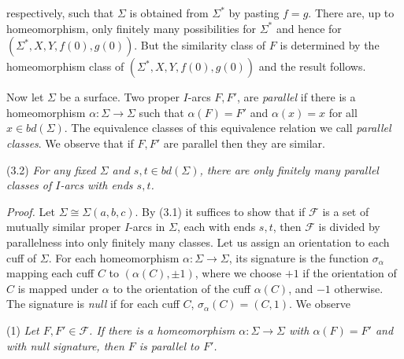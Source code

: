 \noindent respectively, such that $\Sigma$ is obtained from $\Sigma^*$ by pasting $f = g$. There are, up to homeomorphism, only finitely many possibilities for $\Sigma^*$ and hence for $(\Sigma^*, X, Y, f(0), g(0))$. But the similarity class of $F$ is determined by the homeomorphism class of $(\Sigma^*, X, Y, f(0), g(0))$ and the result follows.

Now let $\Sigma$ be a surface. Two proper $I$-arcs $F, F'$, are \textit{parallel} if there is a homeomorphism $\alpha \colon \Sigma \to \Sigma$ such that $\alpha(F) = F'$ and $\alpha(x) = x$ for all $x \in bd(\Sigma)$. The equivalence classes of this equivalence relation we call \textit{parallel classes}. We observe that if $F, F'$ are parallel then they are similar.

\stmt
(3.2) \textit{For any fixed $\Sigma$ and $s, t \in bd(\Sigma)$, there are only finitely many parallel classes of $I$-arcs with ends $s, t$.}

\textit{Proof.} Let $\Sigma \cong \Sigma(a, b, c)$. By (3.1) it suffices to show that if $\mathcal{F}$ is a set of mutually similar proper $I$-arcs in $\Sigma$, each with ends $s, t$, then $\mathcal{F}$ is divided by parallelness into only finitely many classes. Let us assign an orientation to each cuff of $\Sigma$. For each homeomorphism $\alpha \colon \Sigma \to \Sigma$, its signature is the function $\sigma_\alpha$ mapping each cuff $C$ to $(\alpha(C), \pm 1)$, where we choose $+1$ if the orientation of $C$ is mapped under $\alpha$ to the orientation of the cuff $\alpha(C)$, and $-1$ otherwise. The signature is \textit{null} if for each cuff $C$, $\sigma_\alpha(C) = (C, 1)$. We observe

\hspace*{12pt}(1) \textit{Let $F, F' \in \mathcal{F}$. If there is a homeomorphism $\alpha \colon \Sigma \to \Sigma$ with $\alpha(F) = F'$ and with null signature, then $F$ is parallel to $F'$.}

